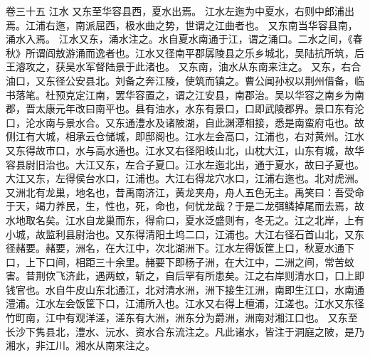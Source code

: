 \documentclass[12pt,UTF8]{ctexbook}
\begin{document}
卷三十五  江水 
又东至华容县西，夏水出焉。
江水左迤为中夏水，右则中郎浦出焉。江浦右迤，南派屈西，极水曲之势，世谓之江曲者也。
又东南当华容县南，涌水入焉。
江水又东，涌水注之。水自夏水南通于江，谓之涌口。二水之间，《春秋》所谓阎敖游涌而逸者也。江水又径南平郡孱陵县之乐乡城北，吴陆抗所筑，后王濬攻之，获吴水军督陆景于此渚也。
又东南，油水从东南来注之。
又东，右合油口，又东径公安县北。刘备之奔江陵，使筑而镇之。曹公闻孙权以荆州借备，临书落笔。杜预克定江南，罢华容置之，谓之江安县，南郡治。吴以华容之南乡为南郡，晋太康元年改曰南平也。县有油水，水东有景口，口即武陵郡界。景口东有沦口，沦水南与景水合。又东通澧水及诸陂湖，自此渊潭相接，悉是南蛮府屯也。故侧江有大城，相承云仓储城，即邸阁也。江水左会高口，江浦也，右对黄州。江水又东得故市口，水与高水通也。江水又右径阳岐山北，山枕大江，山东有城，故华容县尉旧治也。大江又东，左合子夏口。江水左迤北出，通于夏水，故曰子夏也。大江又东，左得侯台水口，江浦也。大江右得龙穴水口，江浦右迤也。北对虎洲。又洲北有龙巢，地名也，昔禹南济江，黄龙夹舟，舟人五色无主。禹笑曰：吾受命于天，竭力养民，生，性也，死，命也，何忧龙哉？于是二龙弭鳞掉尾而去焉，故水地取名矣。江水自龙巢而东，得俞口，夏水泛盛则有，冬无之。江之北岸，上有小城，故监利县尉治也。又东得清阳土坞二口，江浦也。大江右径石首山北，又东径赭要。赭要，洲名，在大江中，次北湖洲下。江水左得饭筐上口，秋夏水通下口，上下口间，相距三十余里。赭要下即杨子洲，在大江中，二洲之间，常苦蚊害。昔荆佽飞济此，遇两蚊，斩之，自后罕有所患矣。江之右岸则清水口，口上即钱官也。水自牛皮山东北通江，北对清水洲，洲下接生江洲，南即生江口，水南通澧浦。江水左会饭筐下口，江浦所入也。江水又右得上檀浦，江溠也。江水又东径竹町南，江中有观洋溠，溠东有大洲，洲东分为爵洲，洲南对湘江口也。
又东至长沙下隽县北，澧水、沅水、资水合东流注之。凡此诸水，皆注于洞庭之陂，是乃湘水，非江川。湘水从南来注之。
\end{document}
